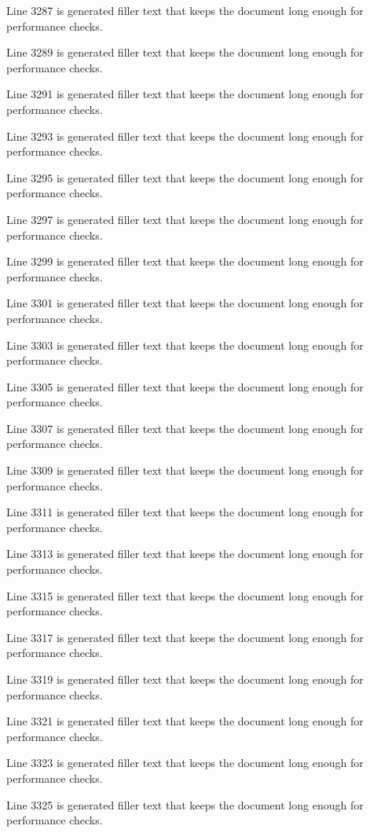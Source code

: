 Line 3287 is generated filler text that keeps the document long enough for performance checks.

Line 3289 is generated filler text that keeps the document long enough for performance checks.

Line 3291 is generated filler text that keeps the document long enough for performance checks.

Line 3293 is generated filler text that keeps the document long enough for performance checks.

Line 3295 is generated filler text that keeps the document long enough for performance checks.

Line 3297 is generated filler text that keeps the document long enough for performance checks.

Line 3299 is generated filler text that keeps the document long enough for performance checks.

Line 3301 is generated filler text that keeps the document long enough for performance checks.

Line 3303 is generated filler text that keeps the document long enough for performance checks.

Line 3305 is generated filler text that keeps the document long enough for performance checks.

Line 3307 is generated filler text that keeps the document long enough for performance checks.

Line 3309 is generated filler text that keeps the document long enough for performance checks.

Line 3311 is generated filler text that keeps the document long enough for performance checks.

Line 3313 is generated filler text that keeps the document long enough for performance checks.

Line 3315 is generated filler text that keeps the document long enough for performance checks.

Line 3317 is generated filler text that keeps the document long enough for performance checks.

Line 3319 is generated filler text that keeps the document long enough for performance checks.

Line 3321 is generated filler text that keeps the document long enough for performance checks.

Line 3323 is generated filler text that keeps the document long enough for performance checks.

Line 3325 is generated filler text that keeps the document long enough for performance checks.

